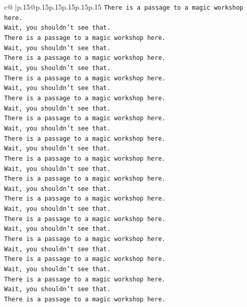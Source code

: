 \documentclass{article}
\begin{document}
{\begin{supertabular}{c@{$\;$}|p{.15\linewidth}@{}p{.15\linewidth}p{.15\linewidth}p{.15\linewidth}p{.15\linewidth}p{.15\linewidth}}
{{{\texttt{There is a passage to a magic workshop here.} \\
\texttt{Wait, you shouldn't see that.} \\
\texttt{There is a passage to a magic workshop here.} \\
\texttt{Wait, you shouldn't see that.} \\
\texttt{There is a passage to a magic workshop here.} \\
\texttt{Wait, you shouldn't see that.} \\
\texttt{There is a passage to a magic workshop here.} \\
\texttt{Wait, you shouldn't see that.} \\
\texttt{There is a passage to a magic workshop here.} \\
\texttt{Wait, you shouldn't see that.} \\
\texttt{There is a passage to a magic workshop here.} \\
\texttt{Wait, you shouldn't see that.} \\
\texttt{There is a passage to a magic workshop here.} \\
\texttt{Wait, you shouldn't see that.} \\
\texttt{There is a passage to a magic workshop here.} \\
\texttt{Wait, you shouldn't see that.} \\
\texttt{There is a passage to a magic workshop here.} \\
\texttt{Wait, you shouldn't see that.} \\
\texttt{There is a passage to a magic workshop here.} \\
\texttt{Wait, you shouldn't see that.} \\
\texttt{There is a passage to a magic workshop here.} \\
\texttt{Wait, you shouldn't see that.} \\
\texttt{There is a passage to a magic workshop here.} \\
\texttt{Wait, you shouldn't see that.} \\
\texttt{There is a passage to a magic workshop here.} \\
\texttt{Wait, you shouldn't see that.} \\
\texttt{There is a passage to a magic workshop here.} \\
\texttt{Wait, you shouldn't see that.} \\
\texttt{There is a passage to a magic workshop here.} \\
}}}
\end{supertabular}}
\end{document}

